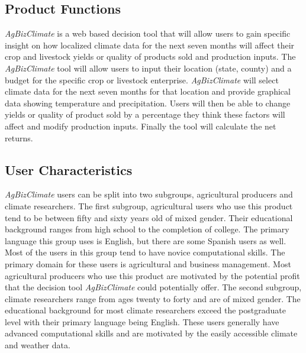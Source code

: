 \documentclass[onecolumn, draftclsnofoot,10pt, compsoc]{article}
\begin{document}
	\subsection {Product Functions}
			\textit{AgBizClimate} is a web based decision tool that will allow users to gain specific insight on how localized climate data for the next seven months will affect their crop and livestock yields or quality of products sold and production inputs. The \textit{AgBizClimate} tool will allow users to input their location (state, county) and a budget for the specific crop or livestock enterprise. \textit{AgBizClimate} will select climate data for the next seven months for that location and provide graphical data showing temperature and precipitation. Users will then be able to change yields or quality of product sold by a percentage they think these factors will affect and modify production inputs. Finally the tool will calculate the net returns.\\

	\subsection{User Characteristics}
		\textit{AgBizClimate} users can be split into two subgroups, agricultural producers and climate researchers. The first subgroup, agricultural users who use this product tend to be between fifty and sixty years old of mixed gender. Their educational background ranges from high school to the completion of college. The primary language this group uses is English, but there are some Spanish users as well. Most of the users in this group tend to have novice computational skills. The primary domain for these users is agricultural and business management. Most agricultural producers who use this product are motivated by the potential profit that the decision tool \textit{AgBizClimate} could potentially offer. The second subgroup, climate researchers range from ages twenty to forty and are of mixed gender. The educational background for most climate researchers  exceed the postgraduate level with their primary language being English. These users generally have advanced computational skills and are motivated by the easily accessible climate and weather data.\\
\end{document}
